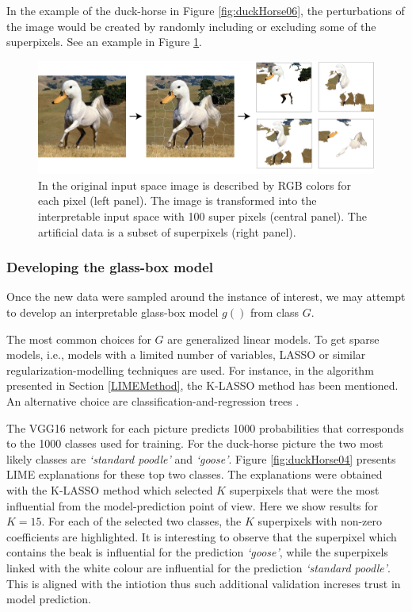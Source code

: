 \documentclass[12pt,]{krantz}
\begin{document}
In the example of the duck-horse in Figure \ref{fig:duckHorse06}, the perturbations of the image would be created by randomly including or excluding some of the superpixels.
See an example in Figure \ref{fig:duckHorseProcess}.

\begin{figure}

{\centering \includegraphics[width=1\linewidth]{figure/duck_horse_process} 

}

\caption{In the original input space image is described by RGB colors for each pixel (left panel). The image is transformed into the interpretable input space with 100 super pixels (central panel). The artificial data is a subset of superpixels (right panel).}\label{fig:duckHorseProcess}
\end{figure}

\hypertarget{developing-the-glass-box-model}{%
\subsubsection{Developing the glass-box model}\label{developing-the-glass-box-model}}

Once the new data were sampled around the instance of interest, we may attempt to develop an interpretable glass-box model \(g()\) from class \(G\).

The most common choices for \(G\) are generalized linear models. To get sparse models, i.e., models with a limited number of variables, LASSO \citep{Tibshirani94regressionshrinkage} or similar regularization-modelling techniques are used. For instance, in the algorithm presented in Section \ref{LIMEMethod}, the K-LASSO method has been mentioned. An alternative choice are classification-and-regression trees \citep{CARTtree}.

The VGG16 network for each picture predicts 1000 probabilities that corresponds to the 1000 classes used for training.
For the duck-horse picture the two most likely classes are \emph{`standard poodle'} and \emph{`goose'}.
Figure \ref{fig:duckHorse04} presents LIME explanations for these top two classes. The explanations were obtained with the K-LASSO method which selected \(K\) superpixels that were the most influential from the model-prediction point of view. Here we show results for \(K=15\). For each of the selected two classes, the \(K\) superpixels with non-zero coefficients are highlighted. It is interesting to observe that the superpixel which contains the beak is influential for the prediction \emph{`goose'}, while the superpixels linked with the white colour are influential for the prediction \emph{`standard poodle'}. This is aligned with the intiotion thus such additional validation increses trust in model prediction.
\end{document}
